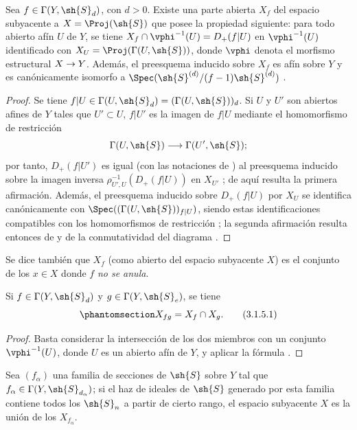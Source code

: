 \documentclass[oneside,10pt]{amsart}
\makeatletter
\newcommand{\ega@arrow}[2]{\mathchoice{#1}{#2}{#2}{#2}}
\renewcommand{\to}{\ega@arrow{\longrightarrow}{\rightarrow}}
\newcommand{\oldpage}[2][]{\marginnote{\normalfont\footnotesize\textbf{#1}~|~#2}\ignorespaces}
\let\EGAOriginalLabel\label
\renewcommand{\label}[1]{\phantomsection\EGAOriginalLabel{#1}}
\makeatother
\begin{document}
\begin{proposition}[3.1.4]
\label{II.3.1.4}
Sea $f\in\Gamma(Y,\sh{S}_d)$, con $d>0$.
Existe una parte abierta $X_f$ del espacio subyacente a $X=\Proj(\sh{S})$ que posee la propiedad siguiente: para todo abierto afín $U$ de $Y$, se tiene $X_f\cap\vphi^{-1}(U)=D_+(f|U)$ en $\vphi^{-1}(U)$ identificado con $X_U=\Proj(\Gamma(U,\sh{S}))$, donde $\vphi$ denota el morfismo estructural $X\to Y$.
\oldpage[II]{51}
Además, el preesquema inducido sobre $X_f$ es afín sobre $Y$ y es canónicamente isomorfo a $\Spec(\sh{S}^{(d)}/(f-1)\sh{S}^{(d)})$ .
\end{proposition}

\begin{proof}
Se tiene $f|U\in\Gamma(U,\sh{S}_d)=(\Gamma(U,\sh{S}))_d$.
Si $U$ y $U'$ son abiertos afines de $Y$ tales que $U'\subset U$, $f|U'$ es la imagen de $f|U$ mediante el homomorfismo de restricción
\[
  \Gamma(U,\sh{S}) \to \Gamma(U',\sh{S});
\]
por tanto, $D_+(f|U')$ es igual (con las notaciones de ) al preesquema inducido sobre la imagen inversa $\rho_{U',U}^{-1}(D_+(f|U))$ en $X_{U'}$ ; de aquí resulta la primera afirmación.
Además, el preesquema inducido sobre $D_+(f|U)$ por $X_U$ se identifica canónicamente con $\Spec((\Gamma(U,\sh{S}))_{f|U})$, siendo estas identificaciones compatibles con los homomorfismos de restricción ; la segunda afirmación resulta entonces de  y de la conmutatividad del diagrama .
\end{proof}

Se dice también que $X_f$ (como abierto del espacio subyacente $X$) es el conjunto de los $x\in X$ donde $f$ \emph{no se anula}.

\begin{corollary}[3.1.5]
\label{II.3.1.5}
Si $f\in\Gamma(Y,\sh{S}_d)$ y $g\in\Gamma(Y,\sh{S}_e)$, se tiene
\[
\label{II.3.1.5.1}
  X_{fg}=X_f\cap X_g.
\tag{3.1.5.1}
\]
\end{corollary}

\begin{proof}
Basta considerar la intersección de los dos miembros con un conjunto $\vphi^{-1}(U)$, donde $U$ es un abierto afín de $Y$, y aplicar la fórmula .
\end{proof}

\begin{corollary}[3.1.6]
\label{II.3.1.6}
Sea $(f_\alpha)$ una familia de secciones de $\sh{S}$ sobre $Y$ tal que $f_\alpha\in\Gamma(Y,\sh{S}_{d_\alpha})$; si el haz de ideales de $\sh{S}$ generado por esta familia  contiene todos los $\sh{S}_n$ a partir de cierto rango, el espacio subyacente $X$ es la unión de los $X_{f_\alpha}$.
\end{corollary}
\end{document}
